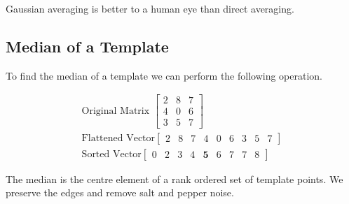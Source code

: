 Gaussian averaging is better to a human eye than direct averaging.

\subsection{Median of a Template}

To find the median of a template we can perform the following operation.

\begin{align}
    \text{Original Matrix }\begin{bmatrix}
    2 & 8 & 7 \\
    4 & 0 & 6 \\
    3 & 5 & 7
    \end{bmatrix} \\
    \text{Flattened Vector}
    \begin{bmatrix}
    2 & 8 & 7 & 4 & 0 & 6 & 3 & 5 & 7
    \end{bmatrix} \\
    \text{Sorted Vector}
    \begin{bmatrix}
    0 & 2 & 3 & 4 & \textbf{5} & 6 & 7 & 7 & 8
    \end{bmatrix}
\end{align}

The median is the centre element of a rank ordered set of template points. We preserve the edges and remove salt and pepper noise.


